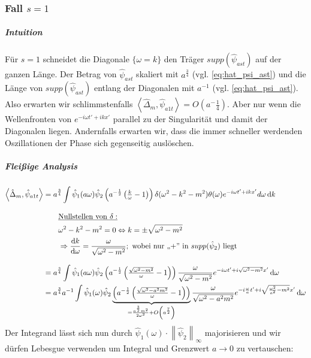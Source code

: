 \subsubsection*{Fall $s=1$}
\subparagraph*{Intuition}
Für $s=1$ schneidet die Diagonale $\{\omega = k\}$ den Träger $supp (\hat \psi_{ast})$ auf der ganzen Länge. Der Betrag von $\hat\psi_{ast}$ skaliert mit $a^{\frac{3}{4}}$ (vgl. \cref{eq:hat_psi_ast}) und die Länge von $supp (\hat \psi_{ast})$ entlang der Diagonalen mit $a^{-1}$ (vgl. \cref{eq:hat_psi_ast}). Also erwarten wir schlimmstenfalls $\left<\hat\Delta_m,  \hat \psi_{a1t}\right> = O\left(a^-{\frac{1}{4}}\right)$. Aber nur wenn die Wellenfronten von $e^{-i\omega t'+i k x'}$ parallel zu der Singularität und damit der Diagonalen liegen. Andernfalls erwarten wir, dass die immer schneller werdenden Oszillationen der Phase sich gegenseitig auslöschen.

\subparagraph*{Fleißige Analysis}
\begin{align}
    \left<\hat \Delta_m, \hat \psi_{a1t}\right> &=
        a^{\frac{3}{4}} \int \hat \psi_1(a\omega)
        \hat\psi_2\left(a^{-\frac{1}{2}} \left(\tfrac{k}{\omega}-1\right)\right)
        \delta (\omega^2 - k^2 - m^2) \theta(\omega)
        e^{-i\omega t' + ikx'} d \omega \mathop{}\!\mathrm{d} k \nonumber \\[2ex]
        & \kern 2em \underline{\textrm{Nullstellen von $\delta$}:}
        \nonumber \\
        & \kern 2em \omega^2 - k^2 - m^2 = 0 \Leftrightarrow k = \pm \sqrt{\omega^2-m^2}
        \nonumber \\
        & \kern 2em \Rightarrow \frac{\mathop{}\!\mathrm{d} k}{\mathop{}\!\mathrm{d} \omega} = \frac{\omega}{\sqrt{\omega^2-m^2}}; \textrm{   wobei nur ,,+'' in $supp (\hat \psi_2)$ liegt}
        \nonumber \\[2ex]
        &= a^{\frac{3}{4}} \int \hat\psi_1(a \omega)
        \hat\psi_2\left(a^{-\frac{1}{2}} \left(\tfrac{\sqrt{\omega^2-m^2}}{\omega}-1\right)\right)
        \frac{\omega}{\sqrt{\omega^2-m^2}}
        e^{-i\omega t' + i \sqrt{\omega^2-m^2}x'}
        \mathop{}\!\mathrm{d} \omega \nonumber \\
        &= a^{\frac{3}{4}} a^{-1} \int \hat\psi_1(\omega)
        \hat\psi_2
        \underbrace{
        \left(
            a^{-\frac{1}{2}} \left(\tfrac{\sqrt{\omega^2-a^2m^2}}{\omega}-1\right)
        \right)}_{= \frac{a^{\frac{3}{2}}m^2}{2 \omega^2}
                  + O\left(a^{\frac{7}{2}}\right)}
        \frac{\omega}{\sqrt{\omega^2-a^2 m^2}}
        e^{-i\frac{\omega}{a} t' + i \sqrt{\frac{\omega^2}{a^2}-m^2}x'}
        \mathop{}\!\mathrm{d} \omega \nonumber
\end{align}
Der Integrand lässt sich nun durch $\hat \psi_1(\omega) \cdot \left\lVert \hat\psi_2\right\lVert_\infty$ majorisieren und wir dürfen Lebesgue verwenden um Integral und Grenzwert $a \rightarrow 0$ zu vertauschen:

